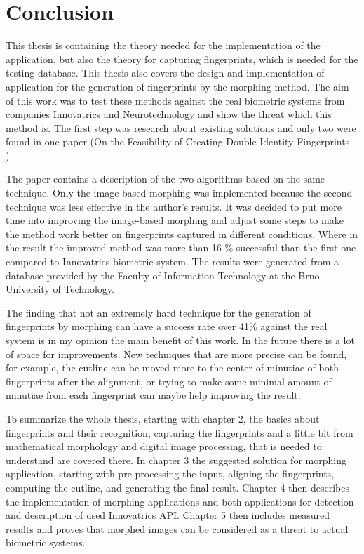 \chapter{Conclusion}
This thesis is containing the theory needed for the implementation of the application, but also the theory for capturing fingerprints, which is needed for the testing database. This thesis also covers the design and implementation of application for the generation of fingerprints by the morphing method. The aim of this work was to test these methods against the real biometric systems from companies Innovatrics and Neurotechnology and show the threat which this method is. The first step was research about existing solutions and only two were found in one paper (On the Feasibility of Creating Double-Identity Fingerprints \cite{morphing_paper}). 

The paper contains a description of the two algorithms based on the same technique. Only the image-based morphing was implemented because the second technique was less effective in the author’s results. It was decided to put more time into improving the image-based morphing and adjust some steps to make the method work better on fingerprints captured in different conditions. Where in the result the improved method was more than 16 \% successful than the first one compared to Innovatrics biometric system. The results were generated from a database provided by the Faculty of Information Technology at the Brno University of Technology. 

The finding that not an extremely hard technique for the generation of fingerprints by morphing can have a success rate over 41\% against the real system is in my opinion the main benefit of this work. In the future there is a lot of space for improvements. New techniques that are more precise can be found, for example, the cutline can be moved more to the center of minutiae of both fingerprints after the alignment, or trying to make some minimal amount of minutiae from each fingerprint can maybe help improving the result.

To summarize the whole thesis, starting with chapter 2, the basics about fingerprints and their recognition, capturing the fingerprints and a little bit from mathematical morphology and digital image processing, that is needed to understand are covered there. In chapter 3 the suggested solution for morphing application, starting with pre-processing the input, aligning the fingerprints, computing the cutline, and generating the final result. Chapter 4 then describes the implementation of morphing applications and both applications for detection and description of used Innovatrics API. Chapter 5 then includes measured results and proves that morphed images can be considered as a threat to actual biometric systems.
